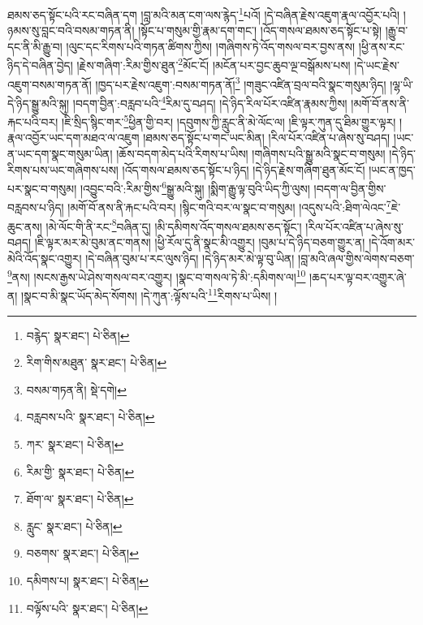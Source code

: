 ཐམས་ཅད་སྟོང་པའི་རང་བཞིན་དག །བླ་མའི་མན་ངག་ལས་རྙེད་\footnote{བརྙེད་  སྣར་ཐང་།  པེ་ཅིན། }པའོ། །དེ་བཞིན་རྗེས་འཇུག་རྣལ་འབྱོར་པའི། །ཉམས་སུ་བླང་བའི་བསམ་གཏན་ནི། །སྟོང་པ་གསུམ་གྱི་རྣམ་དག་གང་། །འོད་གསལ་ཐམས་ཅད་སྟོང་པ་སྟེ། །རྒྱུ་བ་དང་ནི་མི་རྒྱུ་བ། །ལུང་དང་རིགས་པའི་གཏན་ཚིགས་ཀྱིས། །གཞིགས་ཏེ་འོད་གསལ་བར་བྱས་ནས། །ཕྱི་ནས་རང་ཉིད་དེ་བཞིན་བྱེད། །རྗེས་གཞིག་:རིམ་གྱིས་ཐུན་\footnote{རིག་གིས་མཐུན་  སྣར་ཐང་།  པེ་ཅིན། }མོང་ངོ། །མངོན་པར་བྱང་ཆུབ་ལྔ་བསྒོམས་པས། །དེ་ཡང་རྗེས་འཇུག་བསམ་གཏན་ནོ། །ཁྱད་པར་རྗེས་འཇུག་:བསམ་གཏན་ནོ།\footnote{བསམ་གཏན་ནི།  སྡེ་དགེ། } །གཟུང་འཛིན་བྲལ་བའི་སྣང་གསུམ་ཉིད། །ལྷ་ཡི་དེ་ཉིད་སྒྱུ་མའི་སྐུ། །བདག་བྱིན་:བརླབ་པའི་\footnote{བརླབས་པའི་  སྣར་ཐང་།  པེ་ཅིན། }རིམ་དུ་བཤད། །དེ་ཉིད་རིལ་པོར་འཛིན་རྣམས་ཀྱིས། །མགོ་བོ་ནས་ནི་རྐང་པའི་བར། །ཇི་སྲིད་སྙིང་གར་\footnote{ཀར་  སྣར་ཐང་།  པེ་ཅིན། }ཕྱིན་གྱི་བར། །དབུགས་ཀྱི་རླུང་ནི་མེ་ལོང་ལ། །ཇི་ལྟར་ཀུན་དུ་ཐིམ་གྱུར་ལྟར། །རྣལ་འབྱོར་ཡང་དག་མཐའ་ལ་འཇུག །ཐམས་ཅད་སྟོང་པ་གང་ཡང་མིན། །རིལ་པོར་འཛིན་པ་ཞེས་སུ་བཤད། །ཡང་ན་ཡང་དག་སྣང་གསུམ་ཡིན། །ཆོས་བདག་མེད་པའི་རིགས་པ་ཡིས། །གཞིགས་པའི་སྒྱུ་མའི་སྣང་བ་གསུམ། །དེ་ཉིད་རིགས་པས་ཡང་གཞིགས་པས། །འོད་གསལ་ཐམས་ཅད་སྟོང་པ་ཉིད། །དེ་ཉིད་རྗེས་གཞིག་ཐུན་མོང་ངོ། །ཡང་ན་ཁྱད་པར་སྣང་བ་གསུམ། །འབྱུང་བའི་:རིམ་གྱིས་\footnote{རིམ་གྱི་  སྣར་ཐང་།  པེ་ཅིན། }སྒྱུ་མའི་སྐུ། །སྨིག་རྒྱུ་ལྟ་བུའི་ཡིད་ཀྱི་ལུས། །བདག་ལ་བྱིན་གྱིས་བརླབས་པ་ཉིད། །མགོ་བོ་ནས་ནི་རྐང་པའི་བར། །སྙིང་གའི་བར་ལ་སྣང་བ་གསུམ། །འདུས་པའི་:ཐིག་ལེའང་\footnote{ཐོག་ལ་  སྣར་ཐང་།  པེ་ཅིན། }ཇེ་ཆུང་ནས། །མེ་ལོང་གི་ནི་རང་\footnote{རླུང་  སྣར་ཐང་།  པེ་ཅིན། }བཞིན་དུ། །མི་དམིགས་འོད་གསལ་ཐམས་ཅད་སྟོང་། །རིལ་པོར་འཛིན་པ་ཞེས་སུ་བཤད། །ཇི་ལྟར་མར་མེ་བུམ་ནང་གནས། །ཕྱི་རོལ་དུ་ནི་སྣང་མི་འགྱུར། །བུམ་པ་དེ་ཉིད་བཅག་གྱུར་ན། །དེ་འོག་མར་མེའི་འོད་སྣང་འགྱུར། །དེ་བཞིན་བུམ་པ་རང་ལུས་ཉིད། །དེ་ཉིད་མར་མེ་ལྟ་བུ་ཡིན། །བླ་མའི་ཞལ་གྱིས་ལེགས་བཅག་\footnote{བཅགས་  སྣར་ཐང་།  པེ་ཅིན། }ནས། །སངས་རྒྱས་ཡེ་ཤེས་གསལ་བར་འགྱུར། །སྣང་བ་གསལ་ཏེ་མི་:དམིགས་ལ།\footnote{དམིགས་པ།  སྣར་ཐང་།  པེ་ཅིན། } །ཆད་པར་ལྟ་བར་འགྱུར་ཞེ་ན། །སྣང་བ་མི་སྣང་ཡོད་མེད་སོགས། །དེ་ཀུན་:ལྟོས་པའི་\footnote{བལྟོས་པའི་  སྣར་ཐང་།  པེ་ཅིན། }རིགས་པ་ཡིས། །
